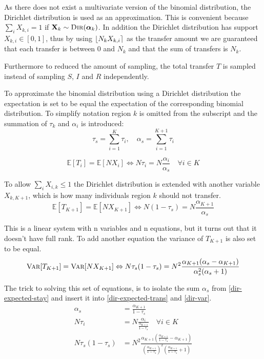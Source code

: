 As there does not exist a multivariate version of the binomial distribution, the Dirichlet distribution is used as an approximation. This is convenient because $\sum_{i} X_{k, i} = 1$ if $\mathbf{X}_k \sim \textsc{Dir}(\boldsymbol{\alpha}_k)$. In addition the Dirichlet distribution has support $X_{k, i} \in [0, 1]$, thus by using $\iround*{N_k X_{k, i}}$ as the transfer amount we are guaranteed that each transfer is between $0$ and $N_k$ and that the sum of transfers is $N_k$.

Furthermore to reduced the amount of sampling, the total transfer $T$ is sampled instead of sampling $S$, $I$ and $R$ independently.

To approximate the binomial distribution using a Dirichlet distribution the expectation is set to be equal the expectation of the corresponding binomial distribution. To simplify notation region $k$ is omitted from the subscript and the summation of $\tau_k$ and $\alpha_i$ is introduced:
\begin{equation}
\tau_s = \sum_{i = 1}^{K} \tau_i, \quad \alpha_s = \sum_{i = 1}^{K+1} \tau_i
\end{equation}

\begin{equation}
\mathbb{E}[T_{i}] = \mathbb{E}[N X_i] \Leftrightarrow N \tau_i = N \frac{\alpha_i}{\alpha_s} \quad \forall i \in K
\label{dir-expected-trans}
\end{equation}

To allow $\sum_{i} X_{i,k} \le 1$ the Dirichlet distribution is extended with another variable $X_{k, K+1}$, which is how many individuals region $k$ should not transfer.
\begin{equation}
\mathbb{E}[T_{K+1}] = \mathbb{E}[N X_{K+1}] \Leftrightarrow N \left(1 - \tau_s\right) = N \frac{\alpha_{K+1}}{\alpha_s}
\label{dir-expected-stay}
\end{equation}
  
This is a linear system with n variables and n equations, but it turns out that it doesn't have full rank. To add another equation the variance of $T_{K+1}$ is also set to be equal.
\begin{equation}
\textsc{Var}[T_{K+1}] = \textsc{Var}[N X_{K+1}] \Leftrightarrow N\tau_s (1 - \tau_s) = N^2 \frac{\alpha_{K+1}(\alpha_s - \alpha_{K+1})}{\alpha_s^2 (\alpha_s + 1)}
\label{dir-var}
\end{equation}

The trick to solving this set of equations, is to isolate the sum $\alpha_s$ from \eqref{dir-expected-stay} and insert it into \eqref{dir-expected-trans} and \eqref{dir-var}.
\begin{align}
\alpha_s &= \frac{\alpha_{K+1}}{1 - \tau_s} \label{dir-expected-intermediate} \\
N \tau_i &= N \frac{\alpha_i}{\frac{\alpha_{K+1}}{1 - \tau_s}} \quad \forall i \in K \\
N\tau_s (1 - \tau_s) &= N^2 \frac{\alpha_{K+1}\left(\frac{\alpha_{K+1}}{1 - \tau_s} - \alpha_{K+1}\right)}{\left(\frac{\alpha_{K+1}}{1 - \tau_s}\right)^2 \left(\frac{\alpha_{K+1}}{1 - \tau_s} + 1\right)} \label{dir-var-intermediate}
\end{align}

